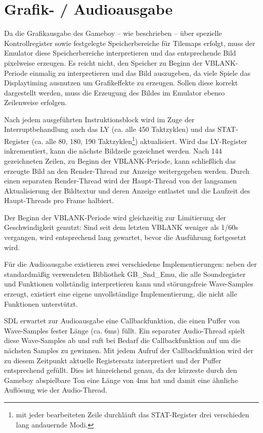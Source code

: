 \documentclass[a4paper]{scrartcl}
\begin{document}
\section{Grafik- / Audioausgabe}

Da die Grafikausgabe des Gameboy -- wie beschrieben -- über spezielle Kontrollregister sowie festgelegte Speicherbereiche für Tilemaps erfolgt, muss der Emulator diese Speicherbereiche interpretieren und das entsprechende Bild pixelweise erzeugen. Es reicht nicht, den Speicher zu Beginn der VBLANK-Periode einmalig zu interpretieren und das Bild auszugeben, da viele Spiele das Displaytiming ausnutzen um Grafikeffekte zu erzeugen. Sollen diese korrekt dargestellt werden, muss die Erzeugung des Bildes im Emulator ebenso Zeilenweise erfolgen.

Nach jedem ausgeführten Instruktionsblock wird im Zuge der Interruptbehandlung auch das LY (ca. alle 450 Taktzyklen) und das STAT-Register (ca. alle 80, 180, 190 Taktzyklen\footnote{mit jeder bearbeiteten Zeile durchläuft das STAT-Register drei verschieden lang andauernde Modi.}) aktualisiert. Wird das LY-Register inkrementiert, kann die nächste Bildzeile gezeichnet werden. Nach 144 gezeichneten Zeilen, zu Beginn der VBLANK-Periode, kann schließlich das erzeugte Bild an den Render-Thread zur Anzeige weitergegeben werden. Durch einen separaten Render-Thread wird der Haupt-Thread von der langsamen Aktualisierung der Bildtextur und deren Anzeige entlastet und die Laufzeit des Haupt-Threads pro Frame halbiert.

Der Beginn der VBLANK-Periode wird gleichzeitig zur Limitierung der Geschwindigkeit genutzt: Sind seit dem letzten VBLANK weniger als 1/60s vergangen, wird entsprechend lang gewartet, bevor die Ausführung fortgesetzt wird.

Für die Audioausgabe existieren zwei verschiedene Implementierungen: neben der standardmäßig verwendeten Bibliothek GB\_Snd\_Emu, die alle Soundregister und Funktionen vollständig interpretieren kann und störungsfreie Wave-Samples erzeugt, existiert eine eigene unvollständige Implementierung, die nicht alle Funktionen unterstützt.

SDL erwartet zur Audioausgabe eine Callbackfunktion, die einen Puffer von Wave-Samples fester Länge (ca. 6ms) füllt. Ein separater Audio-Thread spielt diese Wave-Samples ab und ruft bei Bedarf die Callbackfunktion auf um die nächsten Samples zu gewinnen. Mit jedem Aufruf der Callbackfunktion wird der zu diesem Zeitpunkt aktuelle Registersatz interpretiert und der Puffer entsprechend gefüllt. Dies ist hinreichend genau, da der kürzeste durch den Gameboy abspielbare Ton eine Länge von 4ms hat und damit eine ähnliche Auflösung wie der Audio-Thread.
\end{document}
